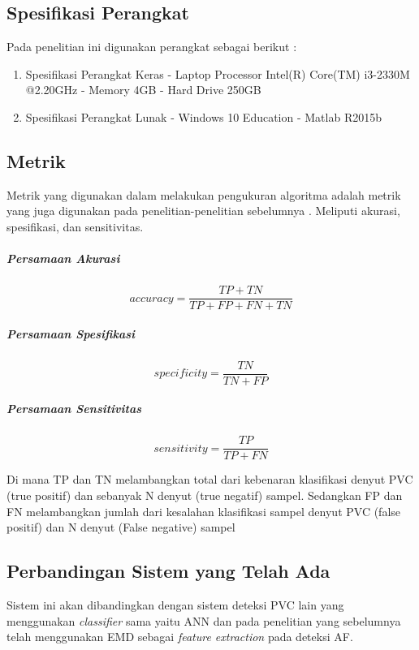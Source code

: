 \subsection{Spesifikasi Perangkat}
Pada penelitian ini digunakan perangkat sebagai berikut :
	\begin{enumerate}
		\item Spesifikasi Perangkat Keras
		\subitem - Laptop Processor Intel(R) Core(TM) i3-2330M @2.20GHz
		\subitem - Memory 4GB 
		\subitem - Hard Drive 250GB
		\item Spesifikasi Perangkat Lunak
		\subitem - Windows 10 Education
		\subitem - Matlab R2015b
 
	\end{enumerate} 

	
\subsection{Metrik}
Metrik yang digunakan dalam melakukan pengukuran algoritma adalah metrik yang juga digunakan pada penelitian-penelitian sebelumnya \cite{Karpagachelvi2010,yasinKaya}. Meliputi akurasi, spesifikasi, dan sensitivitas.

\subparagraph {Persamaan Akurasi}
\begin{equation}\label{akurasi}
accuracy = \frac{TP + TN}{TP+FP+FN+TN}
\end{equation}

\subparagraph {Persamaan Spesifikasi}
\begin{equation}\label{spesifikasi}
specificity = \frac{TN}{TN+FP}
\end{equation}

\subparagraph {Persamaan Sensitivitas}
\begin{equation}\label{sensitivitas}
sensitivity = \frac{TP}{TP+FN}
\end{equation}

Di mana TP dan TN melambangkan total dari kebenaran klasifikasi denyut PVC (true positif) dan sebanyak N denyut (true negatif) sampel. Sedangkan FP dan FN melambangkan jumlah dari kesalahan klasifikasi sampel denyut PVC (false positif) dan N denyut (False negative) sampel\cite{yasinKaya}

\subsection{Perbandingan Sistem yang Telah Ada}
Sistem ini akan dibandingkan dengan sistem deteksi PVC lain yang menggunakan \textit{classifier} sama yaitu ANN\cite{Arief2015,Sreelakshmi} dan pada penelitian yang sebelumnya telah menggunakan EMD sebagai \textit{feature extraction} pada deteksi AF\cite{UMaji}.


